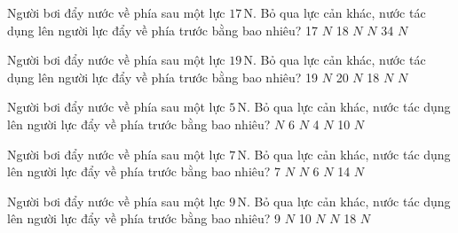 \begin{ex}
Người bơi đẩy nước về phía sau một lực $17\,\text{N}$. Bỏ qua lực cản khác, nước tác dụng lên người lực đẩy về phía trước bằng bao nhiêu?
\choice
{17 $N$}
{18 $N$}
{ $N$}
{34 $N$}
\end{ex}

\begin{ex}
Người bơi đẩy nước về phía sau một lực $19\,\text{N}$. Bỏ qua lực cản khác, nước tác dụng lên người lực đẩy về phía trước bằng bao nhiêu?
\choice
{19 $N$}
{20 $N$}
{18 $N$}
{ $N$}
\end{ex}

\begin{ex}
Người bơi đẩy nước về phía sau một lực $5\,\text{N}$. Bỏ qua lực cản khác, nước tác dụng lên người lực đẩy về phía trước bằng bao nhiêu?
\choice
{ $N$}
{6 $N$}
{4 $N$}
{10 $N$}
\end{ex}

\begin{ex}
Người bơi đẩy nước về phía sau một lực $7\,\text{N}$. Bỏ qua lực cản khác, nước tác dụng lên người lực đẩy về phía trước bằng bao nhiêu?
\choice
{7 $N$}
{ $N$}
{6 $N$}
{14 $N$}
\end{ex}

\begin{ex}
Người bơi đẩy nước về phía sau một lực $9\,\text{N}$. Bỏ qua lực cản khác, nước tác dụng lên người lực đẩy về phía trước bằng bao nhiêu?
\choice
{9 $N$}
{10 $N$}
{ $N$}
{18 $N$}
\end{ex}

